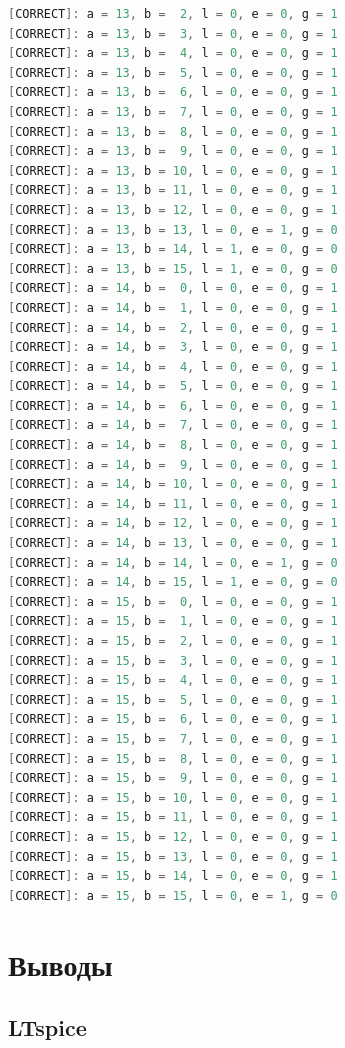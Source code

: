 \documentclass[12pt,onecolumn]{article}
\begin{document}
\begin{lstlisting}[style=verilog, language=Verilog]
[CORRECT]: a = 13, b =  2, l = 0, e = 0, g = 1
[CORRECT]: a = 13, b =  3, l = 0, e = 0, g = 1
[CORRECT]: a = 13, b =  4, l = 0, e = 0, g = 1
[CORRECT]: a = 13, b =  5, l = 0, e = 0, g = 1
[CORRECT]: a = 13, b =  6, l = 0, e = 0, g = 1
[CORRECT]: a = 13, b =  7, l = 0, e = 0, g = 1
[CORRECT]: a = 13, b =  8, l = 0, e = 0, g = 1
[CORRECT]: a = 13, b =  9, l = 0, e = 0, g = 1
[CORRECT]: a = 13, b = 10, l = 0, e = 0, g = 1
[CORRECT]: a = 13, b = 11, l = 0, e = 0, g = 1
[CORRECT]: a = 13, b = 12, l = 0, e = 0, g = 1
[CORRECT]: a = 13, b = 13, l = 0, e = 1, g = 0
[CORRECT]: a = 13, b = 14, l = 1, e = 0, g = 0
[CORRECT]: a = 13, b = 15, l = 1, e = 0, g = 0
[CORRECT]: a = 14, b =  0, l = 0, e = 0, g = 1
[CORRECT]: a = 14, b =  1, l = 0, e = 0, g = 1
[CORRECT]: a = 14, b =  2, l = 0, e = 0, g = 1
[CORRECT]: a = 14, b =  3, l = 0, e = 0, g = 1
[CORRECT]: a = 14, b =  4, l = 0, e = 0, g = 1
[CORRECT]: a = 14, b =  5, l = 0, e = 0, g = 1
[CORRECT]: a = 14, b =  6, l = 0, e = 0, g = 1
[CORRECT]: a = 14, b =  7, l = 0, e = 0, g = 1
[CORRECT]: a = 14, b =  8, l = 0, e = 0, g = 1
[CORRECT]: a = 14, b =  9, l = 0, e = 0, g = 1
[CORRECT]: a = 14, b = 10, l = 0, e = 0, g = 1
[CORRECT]: a = 14, b = 11, l = 0, e = 0, g = 1
[CORRECT]: a = 14, b = 12, l = 0, e = 0, g = 1
[CORRECT]: a = 14, b = 13, l = 0, e = 0, g = 1
[CORRECT]: a = 14, b = 14, l = 0, e = 1, g = 0
[CORRECT]: a = 14, b = 15, l = 1, e = 0, g = 0
[CORRECT]: a = 15, b =  0, l = 0, e = 0, g = 1
[CORRECT]: a = 15, b =  1, l = 0, e = 0, g = 1
[CORRECT]: a = 15, b =  2, l = 0, e = 0, g = 1
[CORRECT]: a = 15, b =  3, l = 0, e = 0, g = 1
[CORRECT]: a = 15, b =  4, l = 0, e = 0, g = 1
[CORRECT]: a = 15, b =  5, l = 0, e = 0, g = 1
[CORRECT]: a = 15, b =  6, l = 0, e = 0, g = 1
[CORRECT]: a = 15, b =  7, l = 0, e = 0, g = 1
[CORRECT]: a = 15, b =  8, l = 0, e = 0, g = 1
[CORRECT]: a = 15, b =  9, l = 0, e = 0, g = 1
[CORRECT]: a = 15, b = 10, l = 0, e = 0, g = 1
[CORRECT]: a = 15, b = 11, l = 0, e = 0, g = 1
[CORRECT]: a = 15, b = 12, l = 0, e = 0, g = 1
[CORRECT]: a = 15, b = 13, l = 0, e = 0, g = 1
[CORRECT]: a = 15, b = 14, l = 0, e = 0, g = 1
[CORRECT]: a = 15, b = 15, l = 0, e = 1, g = 0
\end{lstlisting}

\section{Выводы}
\subsection{LTspice}
\end{document}
